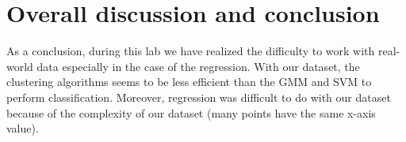 \section{Overall discussion and conclusion}


As a conclusion, during this lab we have realized the difficulty to work with real-world data especially in the case of the regression. With our dataset, the clustering algorithms seems to be less efficient than the GMM and SVM to perform classification. Moreover, regression was difficult to do with our dataset because of the complexity of our dataset (many points have the same x-axis value).